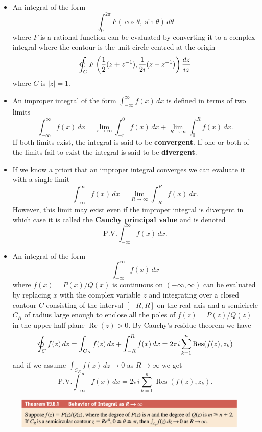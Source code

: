 \documentclass{article}
\renewcommand{\Re}{\operatorname{Re}}
\newcommand{\Res}{\operatorname{Res}}
\begin{document}
\begin{itemize}
  \item An integral of the form \[\int_0^{2 \pi} F(\cos \theta, \sin \theta) \,d \theta\] where $F$ is a rational function can be evaluated by converting it to a complex integral where the contour is the unit circle centred at the origin \[\varointctrclockwise_C F \left( \frac{1}{2}(z + z^{-1}), \frac{1}{2 i} (z - z^{-1}) \right) \frac{d z}{i z}\] where $C$ is $|z| = 1$.

  \item An improper integral of the form $\int_{-\infty}^\infty f(x) \,d x$ is defined in terms of two limits \[\int_{-\infty}^\infty f(x) \,d x = \lim_{r \rightarrow \infty} \int_{-r}^0 f(x) \,d x + \lim_{R \rightarrow \infty} \int_0^R f(x) \,d x.\] If both limits exist, the integral is said to be \textbf{convergent}. If one or both of the limits fail to exist the integral is said to be \textbf{divergent}.

  \item If we know a priori that an improper integral converges we can evaluate it with a single limit \[\int_{-\infty}^\infty f(x) \,d x = \lim_{R \rightarrow \infty} \int_{-R}^R f(x) \,d x.\] However, this limit may exist even if the improper integral is divergent in which case it is called the \textbf{Cauchy principal value} and is denoted \[\text{P.V.} \int_{-\infty}^\infty f(x) \,d x.\]

  \item An integral of the form \[\int_{-\infty}^\infty f(x) \,d x\] where $f(x) = P(x) / Q(x)$ is continuous on $(-\infty, \infty)$ can be evaluated by replacing $x$ with the complex variable $z$ and integrating over a closed contour $C$ consisting of the interval $[-R, R]$ on the real axis and a semicircle $C_R$ of radius large enough to enclose all the poles of $f(z) = P(z) / Q(z)$ in the upper half-plane $\Re(z) > 0$. By Cauchy's residue theorem we have \[\varointctrclockwise_C f(z) \,d z = \int_{C_R} f(z) \,d z + \int_{-R}^R f(x) \,d x = 2 \pi i \sum_{k = 1}^n \Res(f(z), z_k)\] and if we assume $\int_{C_R} f(z) \,d z \rightarrow 0$ as $R \rightarrow \infty$ we get \[\text{P.V.} \int_{-\infty}^\infty f(x) \,d x = 2 \pi i \sum_{k = 1}^n \Res(f(z), z_k).\]
\end{itemize}

\begin{figure}[H]
  \centering
  \includegraphics[width=\textwidth]{theorem-19.6.1}
\end{figure}
\end{document}
